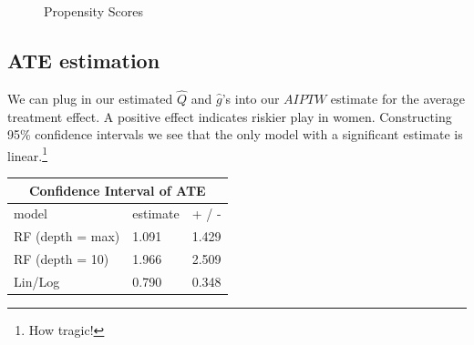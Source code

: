 \documentclass[letterpaper, 11pt]{article}
\begin{document}
        \begin{figure}[H]
            \centering
            \quad
            \quad
            \quad
            \caption{Propensity Scores}
            \label{fig:example}
        \end{figure}

    \subsection*{ATE estimation}

        We can plug in our estimated $\hat{Q}$ and $\hat{g}$'s into our $AIPTW$ estimate for the average treatment effect.
        A positive effect indicates riskier play in women.
        Constructing 95\% confidence intervals we see that the only model with a significant estimate is linear.\footnote{How tragic!} \\

        {
        \centering
        \begin{tabular}{ |p{4cm}||p{2cm}|p{2cm}| }
            \hline
            \multicolumn{3}{|c|}{Confidence Interval of ATE} \\
            \hline
            model & estimate & + / - \\
            \hline
            RF (depth = max) & 1.091 & 1.429 \\
            RF (depth = 10)  & 1.966 & 2.509 \\
            Lin/Log          & 0.790 & 0.348 \\
            \hline
        \end{tabular} \par
        }
\end{document}
